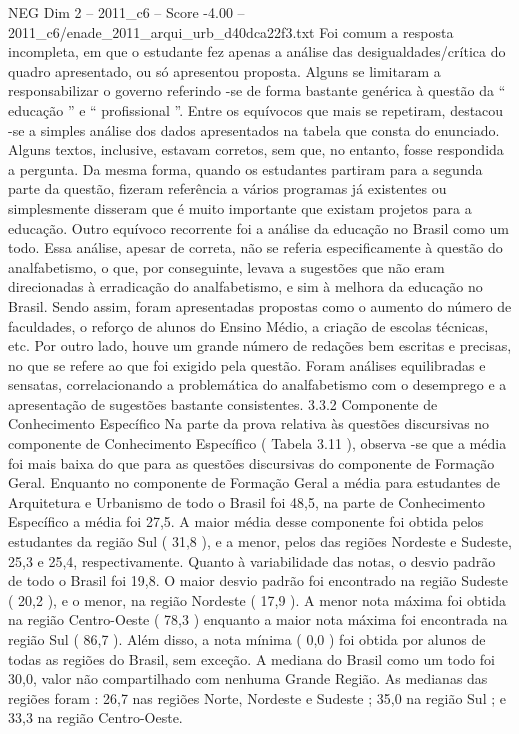 \begin{textsample}{NEG Dim 2 – 2011\_c6 – Score -4.00 – 2011\_c6/enade\_2011\_arqui\_urb\_d40dca22f3.txt}
Foi comum a resposta incompleta, em que o estudante fez apenas a análise das desigualdades/crítica do quadro apresentado, ou só apresentou proposta.
Alguns se limitaram a responsabilizar o governo referindo -se de forma bastante genérica à questão da “ educação ” e “ profissional ”.
Entre os equívocos que mais se repetiram, destacou -se a simples análise dos dados apresentados na tabela que consta do enunciado.
Alguns textos, inclusive, estavam corretos, sem que, no entanto, fosse respondida a pergunta.
Da mesma forma, quando os estudantes partiram para a segunda parte da questão, fizeram referência a vários programas já existentes ou simplesmente disseram que é muito importante que existam projetos para a educação.
Outro equívoco recorrente foi a análise da educação no Brasil como um todo.
Essa análise, apesar de correta, não se referia especificamente à questão do analfabetismo, o que, por conseguinte, levava a sugestões que não eram direcionadas à erradicação do analfabetismo, e sim à melhora da educação no Brasil.
Sendo assim, foram apresentadas propostas como o aumento do número de faculdades, o reforço de alunos do Ensino Médio, a criação de escolas técnicas, etc.
Por outro lado, houve um grande número de redações bem escritas e precisas, no que se refere ao que foi exigido pela questão.
Foram análises equilibradas e sensatas, correlacionando a problemática do analfabetismo com o desemprego e a apresentação de sugestões bastante consistentes. 3.3.2 Componente de Conhecimento Específico Na parte da prova relativa às questões discursivas no componente de Conhecimento Específico ( Tabela 3.11 ), observa -se que a média foi mais baixa do que para as questões discursivas do componente de Formação Geral.
Enquanto no componente de Formação Geral a média para estudantes de Arquitetura e Urbanismo de todo o Brasil foi 48,5, na parte de Conhecimento Específico a média foi 27,5.
A maior média desse componente foi obtida pelos estudantes da região Sul ( 31,8 ), e a menor, pelos das regiões Nordeste e Sudeste, 25,3 e 25,4, respectivamente.
Quanto à variabilidade das notas, o desvio padrão de todo o Brasil foi 19,8.
O maior desvio padrão foi encontrado na região Sudeste ( 20,2 ), e o menor, na região Nordeste ( 17,9 ).
A menor nota máxima foi obtida na região Centro-Oeste ( 78,3 ) enquanto a maior nota máxima foi encontrada na região Sul ( 86,7 ).
Além disso, a nota mínima ( 0,0 ) foi obtida por alunos de todas as regiões do Brasil, sem exceção.
A mediana do Brasil como um todo foi 30,0, valor não compartilhado com nenhuma Grande Região.
As medianas das regiões foram : 26,7 nas regiões Norte, Nordeste e Sudeste ; 35,0 na região Sul ; e 33,3 na região Centro-Oeste.

\end{textsample}
